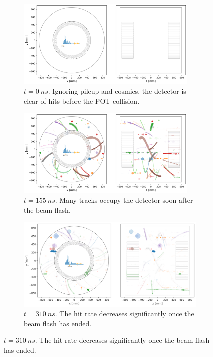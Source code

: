 \begin{figure}
    \centering
    
    \begin{subfigure}[t]{0.59\textwidth}
    \centering
    \includegraphics[width=0.95\textwidth]{chapter3/frame_005.png}
    \caption{$t=\SI{0}{ns}$. Ignoring pileup and cosmics, the detector is clear
    of hits before the POT collision.}
    \end{subfigure}
    
    \begin{subfigure}[t]{0.59\textwidth}
    \centering
    \includegraphics[width=0.95\textwidth]{chapter3/frame_036.png}  
    \caption{$t=\SI{155}{ns}$. Many tracks occupy the detector soon after the
    beam flash.}
    \end{subfigure}
    
    \vspace{0.3cm}
    
    \begin{subfigure}[t]{0.59\textwidth}
    \centering
    \includegraphics[width=\textwidth]{chapter3/frame_067.png}
    \caption{$t=\SI{310}{ns}$. The hit rate decreases significantly once the
    beam flash has ended.}
    \end{subfigure}
    

\end{figure}
